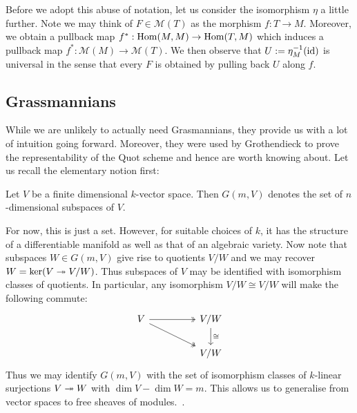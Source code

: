 \documentclass{article}
\begin{document}
Before we adopt this abuse of notation, let us consider the
isomorphism $\eta$ a little further. Note we may think of
$F\in \mathcal M(T)$ as the morphism $f : T \to M$.
Moreover, we obtain a pullback map $f^* : \operatorname{Hom}(M,M) \to \operatorname{Hom}(T,M)$
which induces a pullback map $f^* : \mathcal M(M)\to\mathcal M(T)$.
We then observe that $U := {\eta}^{-1}_M(\operatorname{id})$
is universal in the sense that every $F$ is obtained
by pulling back $U$ along $f$.

\subsection{Grassmannians}

While we are unlikely to actually need Grasmannians, they provide
us with a lot of intuition going forward. Moreover, they were used
by Grothendieck to prove the representability of the Quot scheme
and hence are worth knowing about. Let us recall the elementary
notion first:

\begin{definition}
  Let $V$ be a finite dimensional $k$-vector space. Then
  $G(m,V)$ denotes the set of $n$-dimensional subspaces of $V$.
\end{definition}

For now, this is just a set. However, for suitable choices of
$k$, it has the structure of a differentiable manifold as well as
that of an algebraic variety.
Now note that subspaces $W\in G(m,V)$ give rise to quotients
$V/W$ and we may recover $W=\ker(V\twoheadrightarrow V/W)$. Thus subspaces
of $V$ may be identified with isomorphism classes of quotients.
In particular, any isomorphism $V/W \cong V/W$ will make the following
commute:
\begin{equation*}
  \begin{tikzcd}
    V && {V/W} \\
      && {V/W}
      \arrow[two heads, from=1-1, to=1-3]
      \arrow[two heads, from=1-1, to=2-3]
      \arrow["\cong", from=1-3, to=2-3]
  \end{tikzcd}
\end{equation*}
Thus we may identify $G(m,V)$ with the set of isomorphism
classes of $k$-linear surjections $V\twoheadrightarrow W$ with $\dim V-\dim W=m$.
This allows us to generalise from vector spaces to free sheaves
of modules.~\cite[\href{https://stacks.math.columbia.edu/tag/089R}{Tag 089R}]{stacks-project}. 
\end{document}
